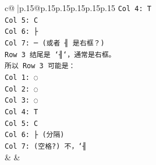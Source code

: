 \documentclass{article}
\begin{document}
{\begin{supertabular}{c@{$\;$}|p{.15\linewidth}@{}p{.15\linewidth}p{.15\linewidth}p{.15\linewidth}p{.15\linewidth}p{.15\linewidth}}
{{{\texttt{Col 4: T} \\
\texttt{Col 5: C} \\
\texttt{Col 6: ├} \\
\texttt{Col 7: ─ (或者 ╢ 是右框？)} \\
\texttt{Row 3 结尾是 `╢`，通常是右框。} \\
\texttt{所以 Row 3 可能是：} \\
\texttt{Col 1: ◌} \\
\texttt{Col 2: ◌} \\
\texttt{Col 3: ◌} \\
\texttt{Col 4: T} \\
\texttt{Col 5: C} \\
\texttt{Col 6: ├ (分隔)} \\
\texttt{Col 7: (空格?) 不，`╢} \\
            }
        }
    }
    & & \\ \\


\end{supertabular}}
\end{document}
